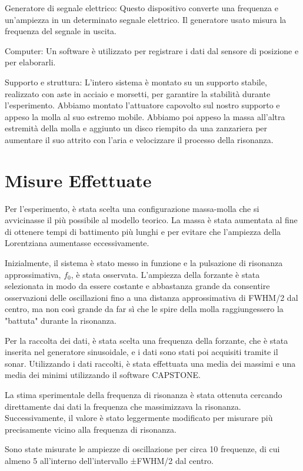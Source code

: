 \documentclass[12pt]{article}
\begin{document}
Generatore di segnale elettrico: Questo dispositivo converte una frequenza e un'ampiezza 
in un determinato segnale elettrico. Il generatore usato misura la frequenza del segnale in uscita.

Computer: Un software è utilizzato per registrare i dati dal sensore di posizione e per elaborarli.

Supporto e struttura: L'intero sistema è montato su un supporto stabile, realizzato 
con aste in acciaio e morsetti, per garantire la stabilità durante l'esperimento. 
Abbiamo montato l'attuatore capovolto sul nostro supporto e appeso la molla al suo estremo mobile. 
Abbiamo poi appeso la massa all'altra estremità della molla e aggiunto un disco riempito 
da una zanzariera per aumentare il suo attrito con l'aria e velocizzare il processo della risonanza.

\section{Misure Effettuate}
Per l'esperimento, è stata scelta una configurazione massa-molla che si avvicinasse il 
più possibile al modello teorico. La massa è stata aumentata al fine di ottenere tempi 
di battimento più lunghi e per evitare che l'ampiezza della Lorentziana aumentasse eccessivamente.

Inizialmente, il sistema è stato messo in funzione e la pulsazione di risonanza approssimativa, 
$f_0$, è stata osservata. L'ampiezza della forzante è stata selezionata in modo da essere 
costante e abbastanza grande da consentire osservazioni delle oscillazioni fino a una distanza 
approssimativa di FWHM/2 dal centro, ma non così grande da far sì che le spire della molla 
raggiungessero la "battuta" durante la risonanza.

Per la raccolta dei dati, è stata scelta una frequenza della forzante, che è stata inserita 
nel generatore sinusoidale, e i dati sono stati poi acquisiti tramite il sonar. Utilizzando 
i dati raccolti, è stata effettuata una media dei massimi e una media dei minimi utilizzando 
il software CAPSTONE.

La stima sperimentale della frequenza di risonanza è stata ottenuta cercando direttamente 
dai dati la frequenza che massimizzava la risonanza. Successivamente, il valore è stato 
leggermente modificato per misurare più precisamente vicino alla frequenza di risonanza.

Sono state misurate le ampiezze di oscillazione per circa 10 frequenze, di cui almeno 5 
all'interno dell'intervallo ±FWHM/2 dal centro.
\end{document}
